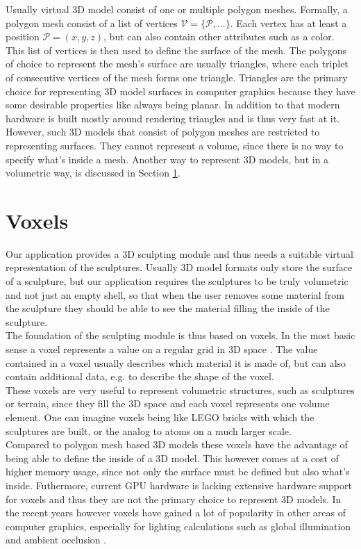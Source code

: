 Usually virtual 3D model consist of one or multiple polygon meshes. Formally, a polygon mesh consist of a list of vertices $\mathcal{V} = \{\mathcal{P}, ...\}$. Each vertex has at least a position $\mathcal{P} = (x, y, z)$, but can also contain other attributes such as a color. This list of vertices is then used to define the surface of the mesh. The polygons of choice to represent the mesh's surface are usually triangles, where each triplet of consecutive vertices of the mesh forms one triangle. Triangles are the primary choice for representing 3D model surfaces in computer graphics because they have some desirable properties like always being planar. In addition to that modern hardware is built mostly around rendering triangles and is thus very fast at it.\\
However, such 3D models that consist of polygon meshes are restricted to representing surfaces. They cannot represent a volume, since there is no way to specify what's inside a mesh. Another way to represent 3D models, but in a volumetric way, is discussed in Section \ref{sec:voxels_concept}.

\section{Voxels}
\label{sec:voxels_concept}

Our application provides a 3D sculpting module and thus needs a suitable virtual representation of the sculptures. Usually 3D model formats only store the surface of a sculpture, but our application requires the sculptures to be
truly volumetric and not just an empty shell, so that when the user removes some material from the sculpture they should be able to see the material filling the inside of the sculpture.\\
The foundation of the sculpting module is thus based on voxels. In the most basic sense a voxel represents a value on a regular grid in 3D space \cite{voxels}.
The value contained in a voxel usually describes which material it is made of, but can also contain additional data, e.g. to describe the shape of the voxel.\\
These voxels are very useful to represent volumetric structures, such as sculptures or terrain, since they fill the 3D space and each voxel represents one volume element. One can imagine voxels being like LEGO bricks with which
the sculptures are built, or the analog to atoms on a much larger scale.\\
Compared to polygon mesh based 3D models these voxels have the advantage of being able to define the inside of a 3D model. This however comes at a cost of higher memory usage, since not only the surface must be defined but also what's inside. Futhermore, current GPU hardware is lacking extensive hardware support for voxels and thus they are not the primary choice to represent 3D models. In the recent years however voxels have gained a lot of popularity in other areas of computer graphics, especially for lighting calculations such as global illumination \cite{voxel_global_illumination} and ambient occlusion \cite{voxel_ambient_occlusion}.

